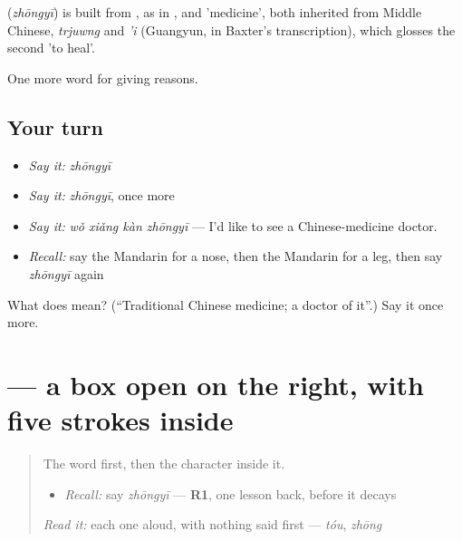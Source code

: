 \begin{cousinweb}
\textbf{} (\emph{zhōngyī}) is built from , as in , and  'medicine', both inherited from Middle Chinese, \emph{trjuwng} and \emph{'i} (Guangyun, in Baxter's transcription), which glosses the second 'to heal'.
\end{cousinweb}

\begin{grammarlens}[title={What you've built}]
One more word for giving reasons.
\end{grammarlens}

\subsection*{Your turn}
\begin{itemize}
\raggedright
  \item \emph{Say it:} \emph{zhōngyī}
  \item \emph{Say it:} \emph{zhōngyī}, once more
  \item \emph{Say it:} \emph{wǒ xiǎng kàn zhōngyī} — I'd like to see a Chinese-medicine doctor.
  \item \emph{Recall:} say the Mandarin for a nose, then the Mandarin for a leg, then say \emph{zhōngyī} again
\end{itemize}

\begin{tcolorbox}[breakable,colback=teal!4,colframe=teal!35!black,title={Before you move on}]
What does  mean? (\textquotedblleft{}Traditional Chinese medicine; a doctor of it\textquotedblright{}.) Say it once more.
\end{tcolorbox}
\section[\texorpdfstring{\zh{医} (yī)}{医 (yī)}]{ — a box open on the right, with five strokes inside}

\label{lesson:ZH-W231-yi-medicine}



\begin{quote}
The word first, then the character inside it.

\begin{itemize}
\raggedright
  \item \emph{Recall:} say \emph{zhōngyī} — \textbf{R1}, one lesson back, before it decays
\end{itemize}

\begin{quote}
 
\end{quote}

\emph{Read it:} each one aloud, with nothing said first — \emph{tóu}, \emph{zhōng}
\end{quote}

